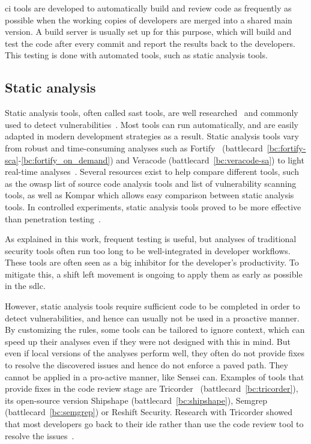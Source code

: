 \Gls{ci} tools are developed to automatically build and review code as frequently as possible when the working copies of developers are merged into a shared main version.
A build server is usually set up for this purpose, which will build and test the code after every commit and report the results back to the developers.
This testing is done with automated tools, such as static analysis tools.

\subsection{Static analysis}
Static analysis tools, often called \gls{sast} tools, are well researched~\cite{li2017static,jovanovic2006pixy,livshits2005finding} and commonly used to detect vulnerabilities~\cite{cruzes2017security,bsimm9,bsimm11}.
Most tools can run automatically, and are easily adapted in modern development strategies as a result.
Static analysis tools vary from robust and time-consuming analyses such as Fortify~\cite{chess2004static} (battlecard~\ref{bc:fortify-sca}-\ref{bc:fortify_on_demand}) and Veracode (battlecard~\ref{bc:veracode-sa}) to light real-time analyses~\cite{brown2016build}.
Several resources exist to help compare different tools, such as the \gls{owasp} list of source code analysis tools and list of vulnerability scanning tools, as well as Kompar which allows easy comparison between static analysis tools.
In controlled experiments, static analysis tools proved to be more effective than penetration testing~\cite{Scandariato2013}.

As explained in this work, frequent testing is useful, but analyses of traditional security tools often run too long to be well-integrated in developer workflows.
These tools are often seen as a big inhibitor for the developer's productivity.
To mitigate this, a shift left movement is ongoing to apply them as early as possible in the \gls{sdlc}.

However, static analysis tools require sufficient code to be completed in order to detect vulnerabilities, and hence can usually not be used in a proactive manner.
By customizing the rules, some tools can be tailored to ignore context, which can speed up their analyses even if they were not designed with this in mind.
But even if local versions of the analyses perform well, they often do not provide fixes to resolve the discovered issues and hence do not enforce a paved path.
They cannot be applied in a pro-active manner, like Sensei can.
Examples of tools that provide fixes in the code review stage are Tricorder~\cite{sadowski2015tricorder} (battlecard~\ref{bc:tricorder}), its open-source version Shipshape (battlecard~\ref{bc:shipshape}), Semgrep (battlecard~\ref{bc:semgrep}) or Reshift Security.
Research with Tricorder showed that most developers go back to their \gls{ide} rather than use the code review tool to resolve the issues~\cite{sadowski2015tricorder}.

